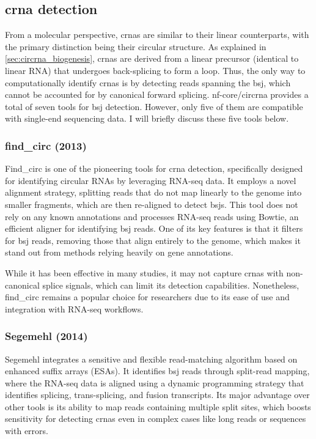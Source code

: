 \subsection{\gls{crna} detection}
\label{subsec:circrna_detection}
From a molecular perspective, \gls{crna}s are similar to their linear
counterparts, with the primary distinction being their circular structure.
As explained in \cref{sec:circrna_biogenesis}, \gls{crna}s are derived from a
linear precursor (identical to linear RNA) that undergoes back-splicing to form
a loop.
Thus, the only way to computationally identify \gls{crna}s is by detecting
reads spanning the \gls{bsj}, which cannot be accounted for by canonical
forward splicing.
nf-core/circrna provides a total of seven tools for \gls{bsj}
detection.
However, only five of them are compatible with single-end sequencing data.
I will briefly discuss these five tools below.

\subsubsection{find\_circ (2013)}
Find\_circ is one of the pioneering tools for \gls{crna} detection,
specifically designed for identifying circular RNAs by leveraging RNA-seq data.
It employs a novel alignment strategy, splitting reads that do not map linearly
to the genome into smaller fragments, which are then re-aligned to detect
\gls{bsj}s\supercite{memczak_circular_2013}.
This tool does not rely on any known annotations and processes RNA-seq reads
using Bowtie, an efficient aligner for identifying \gls{bsj} reads.
One of its key features is that it filters for \gls{bsj} reads, removing those
that align entirely to the genome, which makes it stand out from methods
relying heavily on gene annotations\supercite{memczak_circular_2013}.

While it has been effective in many studies, it may not capture \gls{crna}s
with non-canonical splice signals, which can limit its detection
capabilities\supercite{sekar_circular_2018,liu_prkra_2022}.
Nonetheless, find\_circ remains a popular choice for researchers due to its
ease of use and integration with RNA-seq workflows.

\subsubsection{Segemehl (2014)}
Segemehl integrates a sensitive and flexible read-matching algorithm based on
enhanced suffix arrays (ESAs).
It identifies \gls{bsj} reads through split-read mapping, where the RNA-seq
data is aligned using a dynamic programming strategy that identifies splicing,
trans-splicing, and fusion transcripts.
Its major advantage over other tools is its ability to map reads containing
multiple split sites, which boosts sensitivity for detecting \gls{crna}s even
in complex cases like long reads or sequences with
errors\supercite{hoffmann_multi-split_2014}.

